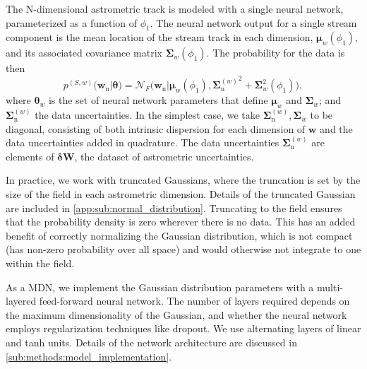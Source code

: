 \documentclass[twocolumn, linenumbers]{aastex631}
\newcommand{\mrm}[1]{\mathrm{#1}}
\newcommand{\mbs}[1]{\boldsymbol{#1}}
\newcommand{\mbf}[1]{\mathbf{#1}}
\newcommand{\mcal}[1]{\mathcal{#1}}
\newcommand{\pdf}{p}
\newcommand{\nth}[1]{{#1}_{\mrm{n}}}  %
\newcommand{\smallcomponent}[2]{#2^{\scriptscriptstyle (#1)}}
\newcommand{\cmp}[2]{\smallcomponent{#1}{#2}}
\newcommand{\astroM}[1]{{#1}_w}
\begin{document}
            The N-dimensional astrometric track is modeled with a single neural
            network, parameterized as a function of $\phi_1$.  The neural
            network output for a single stream component is the mean location of
            the stream track in each dimension, $\astroM{\mbs{\mu}}(\phi_1)$,
            and its associated covariance matrix
            $\astroM{\mbs{\Sigma}}(\phi_1)$. The probability for the data is
            then
            \begin{equation}
                \cmp{S,w}{\pdf}(\nth{\mbs{w}} | \mbs{\theta})
                \!= \mcal{N}_F \big(\nth{\mbs{w}} | \astroM{\mbs{\mu}}\!(\phi_1), {\cmp{w}{\nth{\mbs{\Sigma}}}}^2 \! + \!  \astroM{\mbs{\Sigma}}^2\!\left(\phi_1\right) \!\big),
            \end{equation}
            where $\astroM{\mbs{\theta}}$ is the set of neural network
            parameters that define $\astroM{\mbs{\mu}}$ and
            $\astroM{\mbs{\Sigma}}$; and $\cmp{w}{\nth{\mbs{\Sigma}}}$ the data
            uncertainties.  In the simplest case, we take
            $\cmp{w}{\nth{\mbs{\Sigma}}}, \astroM{\mbs{\Sigma}}$ to be diagonal,
            consisting of both intrinsic dispersion for each dimension of
            $\mbs{w}$ and the data uncertainties added in quadrature. The data
            uncertainties $\cmp{w}{\nth{\mbs{\Sigma}}}$ are elements of
            $\mbs{\delta}\mbf{W}$, the dataset of astrometric uncertainties.

            In practice, we work with truncated Gaussians, where the truncation
            is set by the size of the field in each astrometric dimension.
            Details of the truncated Gaussian are included in
            \autoref{app:sub:normal_distribution}. Truncating to the field
            ensures that the probability density is zero wherever there is no
            data. This has an added benefit of correctly normalizing the
            Gaussian distribution, which is not compact (has non-zero
            probability over all space) and would otherwise not integrate to one
            within the field.

            As a MDN, we implement the Gaussian distribution parameters with a
            multi-layered feed-forward neural network. The number of layers
            required depends on the maximum dimensionality of the Gaussian, and
            whether the neural network employs regularization techniques like
            dropout. We use alternating layers of linear and tanh units. Details
            of the network architecture are discussed in
            \autoref{sub:methods:model_implementation}.
\end{document}
